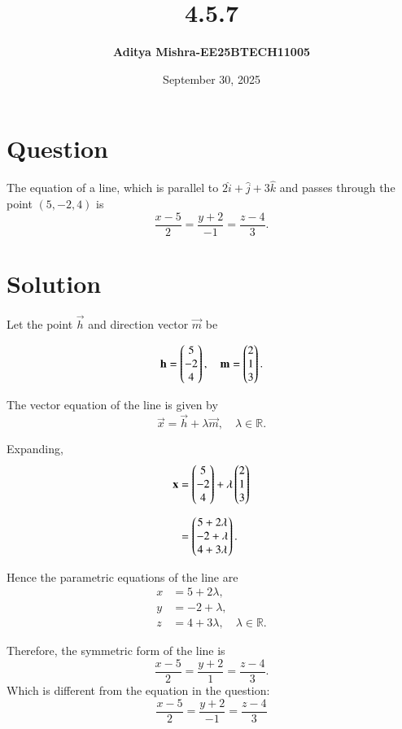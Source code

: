 \documentclass[12pt]{article}
\title{\textbf{4.5.7}}
\author{\textbf{Aditya Mishra-EE25BTECH11005}}
\date{September 30, 2025}
\begin{document}
\maketitle

\section*{Question}

The equation of a line, which is parallel to $2\hat{i} + \hat{j} + 3\hat{k}$ and passes through the point $(5, -2, 4)$ is
\[
\frac{x - 5}{2} = \frac{y + 2}{-1} = \frac{z - 4}{3}.
\]


\section*{Solution}

Let the point $\vec{h}$ and direction vector $\vec{m}$ be  

\[
\mathbf{h} = \begin{pmatrix}5 \\ -2 \\ 4\end{pmatrix}, \quad 
\mathbf{m} = \begin{pmatrix}2 \\ 1 \\ 3\end{pmatrix}.
\]

The vector equation of the line is given by
\[
\vec{x} = \vec{h} + \lambda \vec{m}, \quad \lambda \in \mathbb{R}.
\]

Expanding,  
\begin{align}
\mathbf{x} &= \begin{pmatrix}5 \\ -2 \\ 4\end{pmatrix} + \lambda \begin{pmatrix}2 \\ 1 \\ 3\end{pmatrix} \\[2mm]
           &= \begin{pmatrix}5 + 2\lambda \\ -2 + \lambda \\ 4 + 3 \lambda\end{pmatrix}.
\end{align}

Hence the parametric equations of the line are  
\begin{align}
x &= 5 + 2\lambda, \\
y &= -2 + \lambda, \\
z &= 4 + 3\lambda, \quad \lambda \in \mathbb{R}.
\end{align}

Therefore, the symmetric form of the line is
\[
\boxed{\frac{x - 5}{2} = \frac{y + 2}{1} = \frac{z - 4}{3}}.
\]
Which is different from the equation in the question:
\[
\frac{x - 5}{2} = \frac{y + 2}{-1} = \frac{z - 4}{3}
\]
\end{document}
